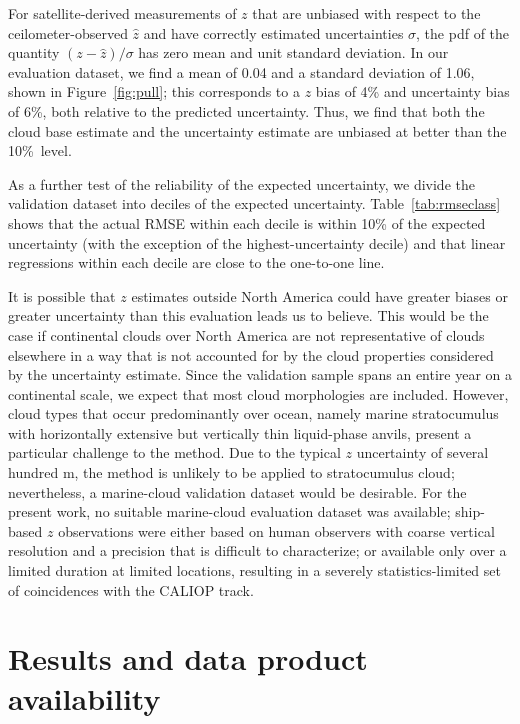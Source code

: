 \documentclass[essd,manuscript]{copernicus}\usepackage[]{graphicx}\usepackage[]{color}
\newcommand\CBH{\ensuremath{z}}
\begin{document}
For satellite-derived measurements of \CBH{} that are unbiased with respect
to the ceilometer-observed $\hat{\CBH}$ and have correctly estimated
uncertainties $\sigma$, the pdf of the quantity $(\CBH - \hat{z})/\sigma$ has zero
mean and unit standard deviation. In our evaluation dataset, we find a mean of
0.04 and a standard
deviation of 1.06, shown in
Figure~\ref{fig:pull}; this corresponds to a \CBH{} bias of %
4\% and
uncertainty bias of %
6\%,
both relative to the predicted uncertainty.  Thus, we find that both the cloud
base estimate and the uncertainty estimate are unbiased at better than the 10\%\
level.

As a further test of the reliability of the expected uncertainty, we divide the
validation dataset into deciles of the expected uncertainty.
Table~\ref{tab:rmseclass} shows that the actual RMSE within each decile is
within 10\% of the expected uncertainty (with the exception of the highest-uncertainty
decile) and that linear regressions within each
decile are close to the one-to-one line.

It is possible that \CBH{} estimates outside North America could have greater
biases or greater uncertainty than this evaluation leads us to believe.  This
would be the case if continental clouds over North America are not
representative of clouds elsewhere in a way that is not accounted for by the
cloud properties considered by the uncertainty estimate.  Since the validation
sample spans an entire year on a continental scale, we expect that most cloud
morphologies are included.
However, cloud types that occur predominantly over ocean, namely marine stratocumulus with
horizontally extensive but vertically thin liquid-phase anvils, 
present a particular challenge to the method.  Due to the
typical \CBH{} uncertainty of several hundred m, the method is unlikely to be
applied to stratocumulus cloud; nevertheless, a marine-cloud validation dataset
would be desirable.  For the present work, no suitable marine-cloud evaluation
dataset was available; ship-based \CBH{} observations were either based on human
observers with coarse vertical resolution and a precision that is difficult to
characterize; or available only over a limited duration at limited
locations, resulting in a severely statistics-limited set of coincidences with
the CALIOP track.

\section{Results and data product availability}
\label{sec:results}
\end{document}
